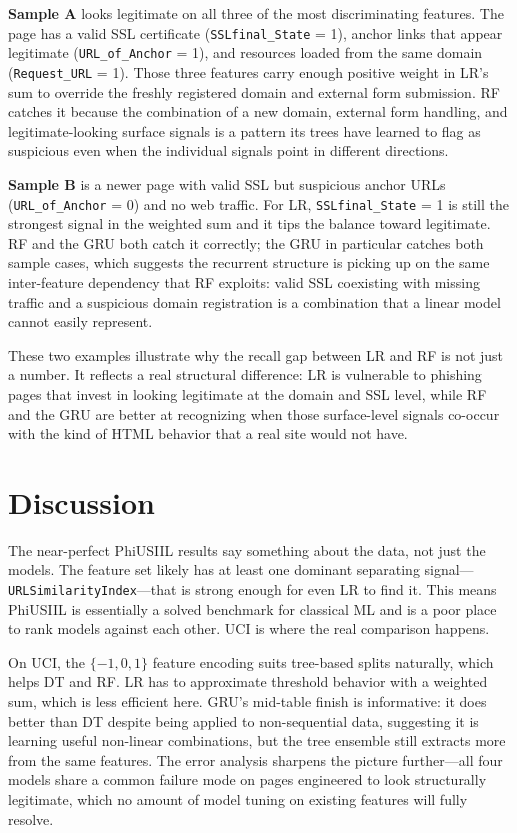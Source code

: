 \documentclass{article}
\begin{document}
\textbf{Sample A} looks legitimate on all three of the most discriminating features.
The page has a valid SSL certificate (\texttt{SSLfinal\_State} = 1), anchor links that appear legitimate (\texttt{URL\_of\_Anchor} = 1), and resources loaded from the same domain (\texttt{Request\_URL} = 1).
Those three features carry enough positive weight in LR's sum to override the freshly registered domain and external form submission.
RF catches it because the combination of a new domain, external form handling, and legitimate-looking surface signals is a pattern its trees have learned to flag as suspicious even when the individual signals point in different directions.

\textbf{Sample B} is a newer page with valid SSL but suspicious anchor URLs (\texttt{URL\_of\_Anchor} = 0) and no web traffic.
For LR, \texttt{SSLfinal\_State} = 1 is still the strongest signal in the weighted sum and it tips the balance toward legitimate.
RF and the GRU both catch it correctly; the GRU in particular catches both sample cases, which suggests the recurrent structure is picking up on the same inter-feature dependency that RF exploits: valid SSL coexisting with missing traffic and a suspicious domain registration is a combination that a linear model cannot easily represent.

These two examples illustrate why the recall gap between LR and RF is not just a number.
It reflects a real structural difference: LR is vulnerable to phishing pages that invest in looking legitimate at the domain and SSL level, while RF and the GRU are better at recognizing when those surface-level signals co-occur with the kind of HTML behavior that a real site would not have.

\section{Discussion}
\label{sec:discussion}

The near-perfect PhiUSIIL results say something about the data, not just the models.
The feature set likely has at least one dominant separating signal---\texttt{URLSimilarityIndex}---that is strong enough for even LR to find it.
This means PhiUSIIL is essentially a solved benchmark for classical ML and is a poor place to rank models against each other.
UCI is where the real comparison happens.

On UCI, the $\{-1, 0, 1\}$ feature encoding suits tree-based splits naturally, which helps DT and RF.
LR has to approximate threshold behavior with a weighted sum, which is less efficient here.
GRU's mid-table finish is informative: it does better than DT despite being applied to non-sequential data, suggesting it is learning useful non-linear combinations, but the tree ensemble still extracts more from the same features.
The error analysis sharpens the picture further---all four models share a common failure mode on pages engineered to look structurally legitimate, which no amount of model tuning on existing features will fully resolve.
\end{document}
